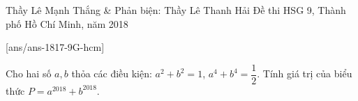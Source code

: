 \begin{name}
{Thầy  Lê Mạnh Thắng \& Phản biện: Thầy Lê Thanh Hải}
{Đề thi HSG 9, Thành phố Hồ Chí Minh, năm 2018}
\end{name}
\setcounter{ex}{0}
[ans/ans-1817-9G-hcm]
\begin{ex}%
	Cho hai số $a,b$ thỏa các điều kiện: $a^2+b^2=1$, $a^4+b^4=\dfrac{1}{2}$. Tính giá trị của biểu thức $P=a^{2018}+b^{2018}$.
\end{ex}

